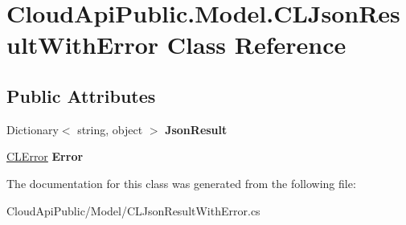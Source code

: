 \hypertarget{class_cloud_api_public_1_1_model_1_1_c_l_json_result_with_error}{\section{Cloud\-Api\-Public.\-Model.\-C\-L\-Json\-Result\-With\-Error Class Reference}
\label{class_cloud_api_public_1_1_model_1_1_c_l_json_result_with_error}
}
\subsection*{Public Attributes}
\begin{DoxyCompactItemize}
\item 
\hypertarget{class_cloud_api_public_1_1_model_1_1_c_l_json_result_with_error_a4d02e59f913be90ce9281fe254e7cd81}{Dictionary$<$ string, object $>$ {\bfseries Json\-Result}}\label{class_cloud_api_public_1_1_model_1_1_c_l_json_result_with_error_a4d02e59f913be90ce9281fe254e7cd81}

\item 
\hypertarget{class_cloud_api_public_1_1_model_1_1_c_l_json_result_with_error_ab386ddc9a6c7fb7a44077e6bf9331168}{\hyperlink{class_cloud_api_public_1_1_model_1_1_c_l_error}{C\-L\-Error} {\bfseries Error}}\label{class_cloud_api_public_1_1_model_1_1_c_l_json_result_with_error_ab386ddc9a6c7fb7a44077e6bf9331168}

\end{DoxyCompactItemize}


The documentation for this class was generated from the following file\-:\begin{DoxyCompactItemize}
\item 
Cloud\-Api\-Public/\-Model/C\-L\-Json\-Result\-With\-Error.\-cs\end{DoxyCompactItemize}

